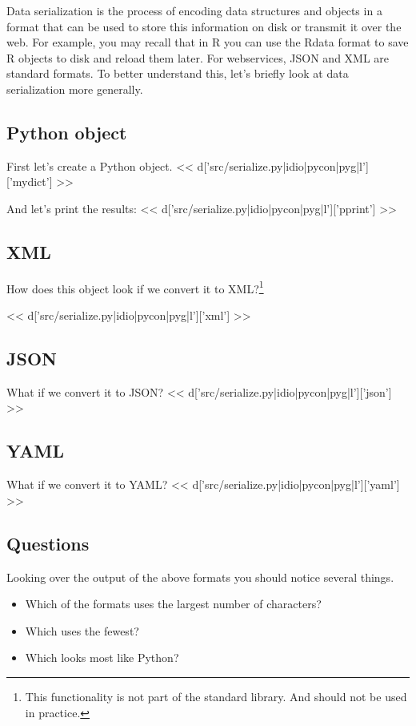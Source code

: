 Data serialization is the process of encoding data structures and objects in a
format that can be used to store this information on disk or transmit it over
the web.  For example, you may recall that in R you can use the Rdata format to
save R objects to disk and reload them later.  For webservices, JSON and XML
are standard formats.  To better understand this, let's briefly look at data
serialization more generally.


\subsection*{Python object}
First let's create a Python object.
<< d['src/serialize.py|idio|pycon|pyg|l']['mydict'] >>

And let's print the results:
<< d['src/serialize.py|idio|pycon|pyg|l']['pprint'] >>

\subsection*{XML}

How does this object look if we convert it to XML?\footnote{This functionality
is not part of the standard library.  And should not be used in practice.}

<< d['src/serialize.py|idio|pycon|pyg|l']['xml'] >>

\subsection*{JSON}
What if we convert it to JSON?
<< d['src/serialize.py|idio|pycon|pyg|l']['json'] >>

\subsection*{YAML}
What if we convert it to YAML?
<< d['src/serialize.py|idio|pycon|pyg|l']['yaml'] >>

\subsection*{Questions}
Looking over the output of the above formats you should notice several things.

\begin{itemize}
\item Which of the formats uses the largest number of characters?
\item Which uses the fewest?
\item Which looks most like Python?
\end{itemize}

